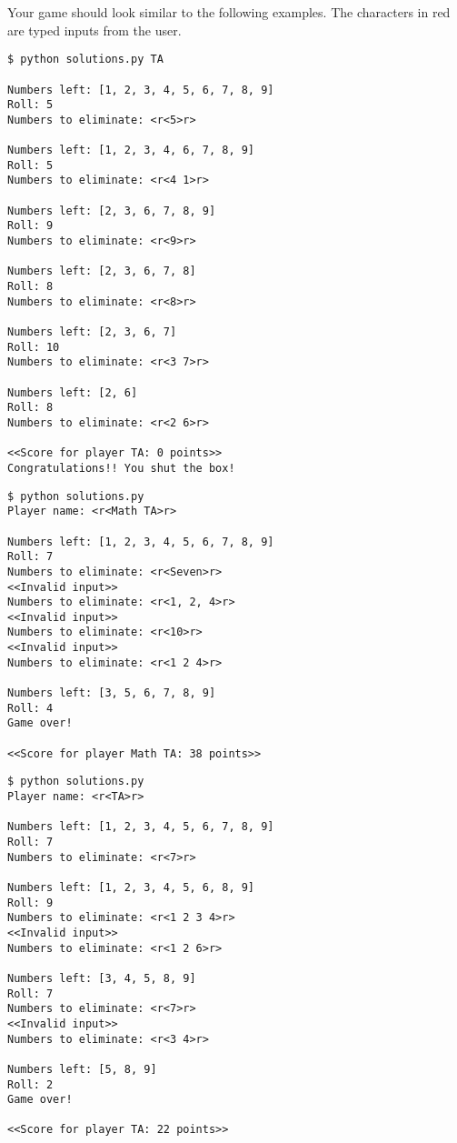\begin{problem}
Your game should look similar to the following examples.
The characters in red are typed inputs from the user.

\begin{lstlisting}
$ python solutions.py TA

Numbers left: [1, 2, 3, 4, 5, 6, 7, 8, 9]
Roll: 5
Numbers to eliminate: <r<5>r>

Numbers left: [1, 2, 3, 4, 6, 7, 8, 9]
Roll: 5
Numbers to eliminate: <r<4 1>r>

Numbers left: [2, 3, 6, 7, 8, 9]
Roll: 9
Numbers to eliminate: <r<9>r>

Numbers left: [2, 3, 6, 7, 8]
Roll: 8
Numbers to eliminate: <r<8>r>

Numbers left: [2, 3, 6, 7]
Roll: 10
Numbers to eliminate: <r<3 7>r>

Numbers left: [2, 6]
Roll: 8
Numbers to eliminate: <r<2 6>r>

<<Score for player TA: 0 points>>
Congratulations!! You shut the box!
\end{lstlisting}
\begin{lstlisting}
$ python solutions.py
Player name: <r<Math TA>r>

Numbers left: [1, 2, 3, 4, 5, 6, 7, 8, 9]
Roll: 7
Numbers to eliminate: <r<Seven>r>
<<Invalid input>>
Numbers to eliminate: <r<1, 2, 4>r>
<<Invalid input>>
Numbers to eliminate: <r<10>r>
<<Invalid input>>
Numbers to eliminate: <r<1 2 4>r>

Numbers left: [3, 5, 6, 7, 8, 9]
Roll: 4
Game over!

<<Score for player Math TA: 38 points>>
\end{lstlisting}
\begin{lstlisting}
$ python solutions.py
Player name: <r<TA>r>

Numbers left: [1, 2, 3, 4, 5, 6, 7, 8, 9]
Roll: 7
Numbers to eliminate: <r<7>r>

Numbers left: [1, 2, 3, 4, 5, 6, 8, 9]
Roll: 9
Numbers to eliminate: <r<1 2 3 4>r>
<<Invalid input>>
Numbers to eliminate: <r<1 2 6>r>

Numbers left: [3, 4, 5, 8, 9]
Roll: 7
Numbers to eliminate: <r<7>r>
<<Invalid input>>
Numbers to eliminate: <r<3 4>r>

Numbers left: [5, 8, 9]
Roll: 2
Game over!

<<Score for player TA: 22 points>>
\end{lstlisting}

\label{prob:shut-the-box}
\end{problem}


